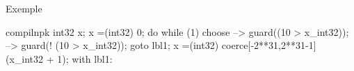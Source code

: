\begin{frame}[fragile]{Exemple}

\begin{SaveVerbatim}{compilnpk}
int32 x;
x =(int32) 0;
do {
    while (1) {
        choose {
            -->
                guard((10 > x_int32));
            -->
                guard(! (10 > x_int32));
                goto lbl1;
        }
        x =(int32) coerce[-2**31,2**31-1]
                        (x_int32 + 1);
    }
} with lbl1: {
}
\end{SaveVerbatim}

{\footnotesize
\begin{minipage}{0.3\linewidth}
\end{minipage}
\vrule\hspace{2pt}
\begin{minipage}{0.6\linewidth}
\end{minipage}
}

\end{frame}
